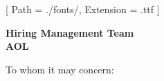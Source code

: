 


\renewcommand{\photo}[2]{}

\geometry{
  left=2cm,
  right=2cm,
  top=2cm,
  bottom=2cm
}



\makecvheader

\setmainfont{NotoSans-Regular}[
  Path = ./fonts/,
  Extension = .ttf
]

\vspace{1cm}
\indent\textbf{Hiring Management Team}\\
\indent\textbf{AOL}

\vspace{0.5cm}

\noindent To whom it may concern:

\vspace{0.5cm}

